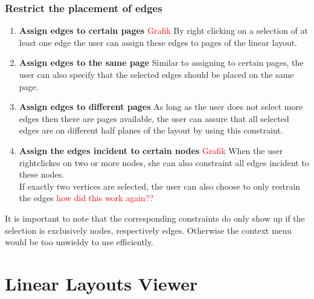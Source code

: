 \subsubsection{Restrict the placement of edges}
\begin{enumerate}
\item \textbf{Assign edges to certain pages}
\textcolor{red}{Grafik}
By right clicking on a selection of at least one edge the user can assign these edges to pages of the linear layout. 
\item \textbf{Assign edges to the same page} Similar to assigning to certain pages, the user can also specify that the selected edges should be placed on the same page. 
\item \textbf{Assign edges to different pages}
As long as the user does not select more edges then there are pages available, the user can assure that all selected edges are on different half planes of the layout by using this constraint.
\item \textbf{Assign the edges incident to certain nodes}
\textcolor{red}{Grafik}
When the user rightclickes on two or more nodes, she can also constraint all edges incident to these nodes.\\
If exactly two vertices are selected, the user can also choose to only restrain the edges \textcolor{red}{how did this work again??}
\end{enumerate}
It is important to note that the corresponding constraints do only show up if the selection is exclusively nodes, respectively edges. Otherwise the context menu would be too unwieldy to use efficiently.
\section{Linear Layouts Viewer}
